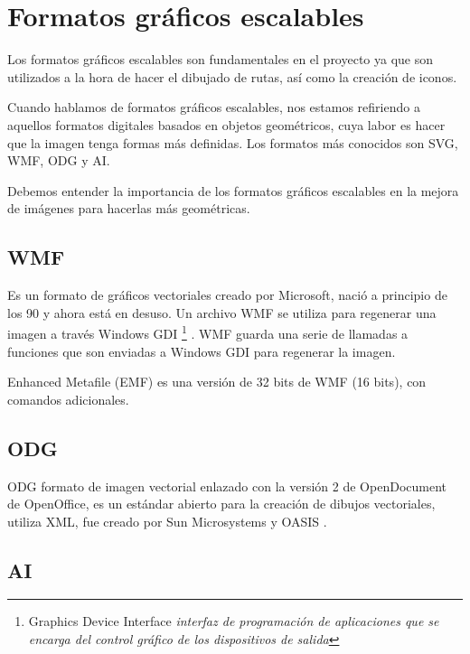 \section{Formatos gráficos escalables}\label{formatos-graficos-escalables}

Los formatos gráficos escalables son fundamentales en el proyecto ya que son utilizados a la hora de hacer el dibujado de rutas, así como la creación de iconos.

Cuando hablamos de formatos gráficos escalables, nos estamos refiriendo a aquellos formatos digitales basados en objetos geométricos, cuya labor es hacer que la imagen tenga formas más definidas.
Los formatos más conocidos son SVG, WMF, ODG  y AI.

Debemos entender la importancia de los formatos gráficos escalables en la mejora de imágenes para hacerlas más geométricas.


\subsection{WMF}\label{wmf}

Es un formato de gráficos vectoriales creado por Microsoft, nació a principio de los 90 y ahora está en desuso. Un archivo WMF se utiliza para regenerar una imagen a través Windows GDI \footnote{Graphics Device Interface \textit{interfaz de programación de aplicaciones que se encarga del control gráfico de los dispositivos de salida}} \hypertarget{_Hlk482387012}{. WMF guarda una serie de llamadas a funciones que son enviadas a Windows GDI para regenerar la imagen.} \cite{metaarchivo}

Enhanced Metafile (EMF) es una versión de 32 bits de WMF (16 bits), con comandos adicionales.



\subsection{ODG}\label{ODG}


ODG formato de imagen vectorial enlazado con la versión 2 de OpenDocument de OpenOffice, es un estándar abierto para la creación de dibujos vectoriales, utiliza XML, fue creado por Sun Microsystems y OASIS \cite{definicionodg}.





\subsection{AI}\label{ai}

